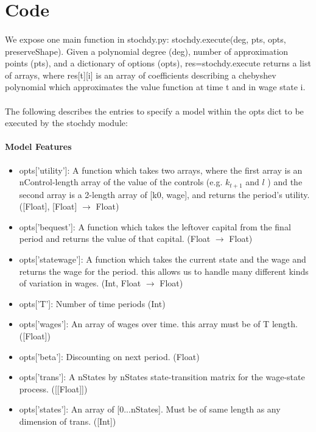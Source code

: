 \documentclass[11pt]{article}
\begin{document}
\section{Code}

\paragraph{} We expose one main function in stochdy.py: stochdy.execute(deg, pts, opts, preserveShape). Given a polynomial degree (deg), number of approximation points (pts), and a dictionary of options (opts), res=stochdy.execute returns a list of arrays, where res[t][i] is an array of coefficients describing a chebyshev polynomial which approximates the value function at time t and in wage state i.

\paragraph{} The following describes the entries to specify a model within the opts dict to be executed by the stochdy module:

\paragraph{Model Features}

\begin{itemize}
\item opts['utility']: A function which takes two arrays, where the first array is an nControl-length array of the value of the controls (e.g. $k_{t+1}$ and $l$ ) and the second array is a 2-length array of [k0, wage], and returns the period's utility. ([Float], [Float] $\rightarrow$ Float)
\item opts['bequest']: A function which takes the leftover capital from the final period and returns the value of that capital. (Float $\rightarrow$ Float)
\item opts['statewage']: A function which takes the current state and the wage and returns the wage for the period. this allows us to handle many different kinds of variation in wages. (Int, Float $\rightarrow$ Float)
\item opts['T']: Number of time periods (Int)
\item opts['wages']: An array of wages over time. this array must be of T length. ([Float])
\item opts['beta']: Discounting on next period. (Float)
\item opts['trans']: A nStates by nStates state-transition matrix for the wage-state process. ([[Float]])
\item opts['states']: An array of [0...nStates]. Must be of same length as any dimension of trans. ([Int])

\end{itemize}
\end{document}
